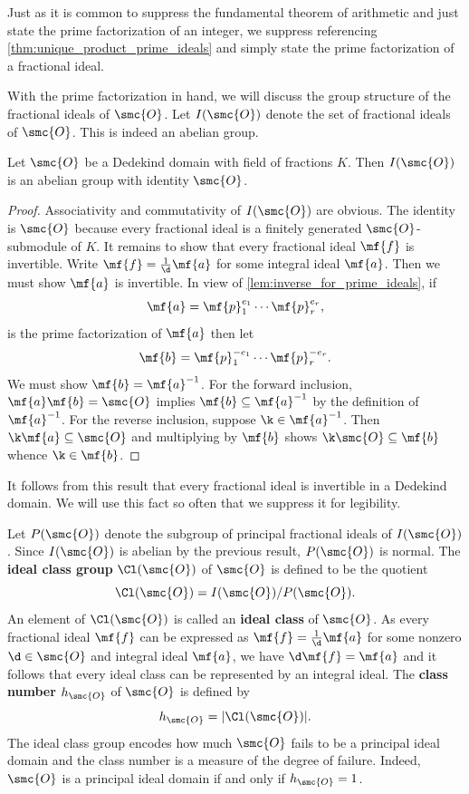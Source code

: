     Just as it is common to suppress the fundamental theorem of arithmetic and just state the prime factorization of an integer, we suppress referencing \cref{thm:unique_product_prime_ideals} and simply state the prime factorization of a fractional ideal.

    With the prime factorization in hand, we will discuss the group structure of the fractional ideals of \(\smc{O}\). Let \(I(\smc{O})\) denote the set of fractional ideals of \(\smc{O}\). This is indeed an abelian group.

    \begin{theorem}\label{thm:ideal_group_is_a_group}
      Let \(\smc{O}\) be a Dedekind domain with field of fractions \(K\). Then \(I(\smc{O})\) is an abelian group with identity \(\smc{O}\).
    \end{theorem}
    \begin{proof}
      Associativity and commutativity of \(I(\smc{O})\) are obvious. The identity is \(\smc{O}\) because every fractional ideal is a finitely generated \(\smc{O}\)-submodule of \(K\). It remains to show that every fractional ideal \(\mf{f}\) is invertible. Write \(\mf{f} = \frac{1}{\d}\mf{a}\) for some integral ideal \(\mf{a}\). Then we must show \(\mf{a}\) is invertible. In view of \cref{lem:inverse_for_prime_ideals}, if
      \[
        \mf{a} = \mf{p}_{1}^{e_{1}} \cdots \mf{p}_{r}^{e_{r}},
      \]
      is the prime factorization of \(\mf{a}\) then let
      \[
        \mf{b} = \mf{p}_{1}^{-e_{1}} \cdots \mf{p}_{r}^{-e_{r}}.
      \]
      We must show \(\mf{b} = \mf{a}^{-1}\). For the forward inclusion, \(\mf{a}\mf{b} = \smc{O}\) implies \(\mf{b} \subseteq \mf{a}^{-1}\) by the definition of \(\mf{a}^{-1}\). For the reverse inclusion, suppose \(\k \in \mf{a}^{-1}\). Then \(\k\mf{a} \subseteq \smc{O}\) and multiplying by \(\mf{b}\) shows \(\k\smc{O} \subseteq \mf{b}\) whence \(\k \in \mf{b}\).
    \end{proof}

    It follows from this result that every fractional ideal is invertible in a Dedekind domain. We will use this fact so often that we suppress it for legibility. 
    
    Let \(P(\smc{O})\) denote the subgroup of principal fractional ideals of \(I(\smc{O})\). Since \(I(\smc{O})\) is abelian by the previous result, \(P(\smc{O})\) is normal. The \textbf{ideal class group} \(\Cl(\smc{O})\) of \(\smc{O}\) is defined to be the quotient
    \[
      \Cl(\smc{O}) = I(\smc{O})/P(\smc{O}).
    \]
    An element of \(\Cl(\smc{O})\) is called an \textbf{ideal class} of \(\smc{O}\). As every fractional ideal \(\mf{f}\) can be expressed as \(\mf{f} = \frac{1}{\d}\mf{a}\) for some nonzero \(\d \in \smc{O}\) and integral ideal \(\mf{a}\), we have \(\d\mf{f} = \mf{a}\) and it follows that every ideal class can be represented by an integral ideal. The \textbf{class number} \(h_{\smc{O}}\) of \(\smc{O}\) is defined by
    \[
      h_{\smc{O}} = |\Cl(\smc{O})|.
    \]
    The ideal class group encodes how much \(\smc{O}\) fails to be a principal ideal domain and the class number is a measure of the degree of failure. Indeed, \(\smc{O}\) is a principal ideal domain if and only if \(h_{\smc{O}} = 1\).

